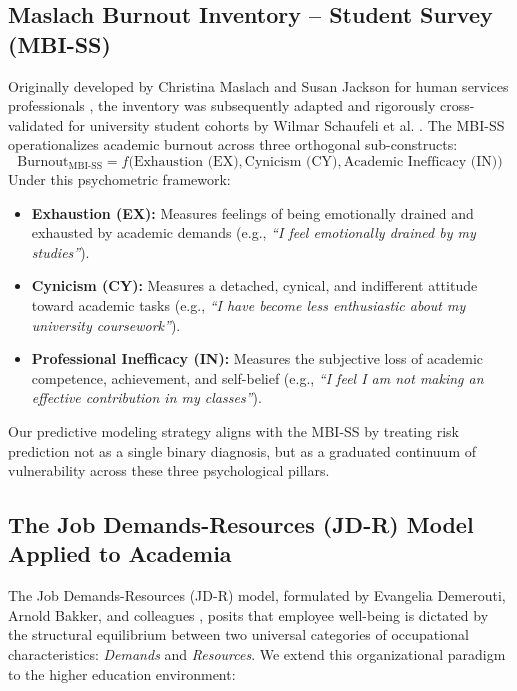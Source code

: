 \documentclass[12pt,a4paper,oneside]{report}
\begin{document}
\subsection{Maslach Burnout Inventory -- Student Survey (MBI-SS)}
Originally developed by Christina Maslach and Susan Jackson for human services professionals \cite{maslach1981}, the inventory was subsequently adapted and rigorously cross-validated for university student cohorts by Wilmar Schaufeli et al. \cite{schaufeli2002}. The MBI-SS operationalizes academic burnout across three orthogonal sub-constructs:
\begin{equation}
    \text{Burnout}_{\text{MBI-SS}} = f\Big( \text{Exhaustion (EX)}, \text{Cynicism (CY)}, \text{Academic Inefficacy (IN)} \Big)
    \label{eq:mbi_framework}
\end{equation}
Under this psychometric framework:
\begin{itemize}
    \item \textbf{Exhaustion (EX):} Measures feelings of being emotionally drained and exhausted by academic demands (e.g., \emph{``I feel emotionally drained by my studies''}).
    \item \textbf{Cynicism (CY):} Measures a detached, cynical, and indifferent attitude toward academic tasks (e.g., \emph{``I have become less enthusiastic about my university coursework''}).
    \item \textbf{Professional Inefficacy (IN):} Measures the subjective loss of academic competence, achievement, and self-belief (e.g., \emph{``I feel I am not making an effective contribution in my classes''}).
\end{itemize}
Our predictive modeling strategy aligns with the MBI-SS by treating risk prediction not as a single binary diagnosis, but as a graduated continuum of vulnerability across these three psychological pillars.

\subsection{The Job Demands-Resources (JD-R) Model Applied to Academia}
The Job Demands-Resources (JD-R) model, formulated by Evangelia Demerouti, Arnold Bakker, and colleagues \cite{demerouti2001}, posits that employee well-being is dictated by the structural equilibrium between two universal categories of occupational characteristics: \emph{Demands} and \emph{Resources}. We extend this organizational paradigm to the higher education environment:
\end{document}
